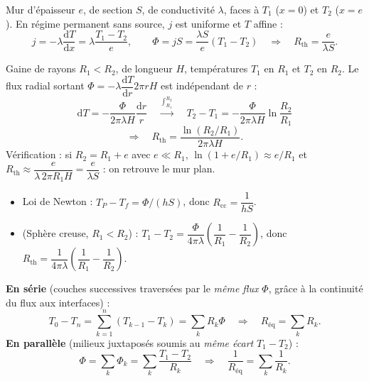 \documentclass[11pt,a4paper]{article}
\newcommand{\dd}{\mathrm{d}}
\begin{document}
\begin{demo}[title={Démonstration : résistance d'un mur plan (cartésien 1D)}]
Mur d'épaisseur $e$, de section $S$, de conductivité $\lambda$, faces à $T_1$ ($x=0$) et $T_2$
($x=e$). En régime permanent sans source, $j$ est uniforme et $T$ affine :
\[ j=-\lambda\dfrac{\dd T}{\dd x}=\lambda\dfrac{T_1-T_2}{e},
   \qquad \Phi=jS=\dfrac{\lambda S}{e}(T_1-T_2)
   \quad\Longrightarrow\quad \boxed{R_{\mathrm{th}}=\dfrac{e}{\lambda S}}. \]
\end{demo}

\begin{demo}[title={Démonstration : résistance d'une gaine cylindrique}]
Gaine de rayons $R_1<R_2$, de longueur $H$, températures $T_1$ en $R_1$ et $T_2$ en $R_2$.
Le flux radial sortant $\Phi=-\lambda\dfrac{\dd T}{\dd r}2\pi rH$ est indépendant de $r$ :
\[ \dd T=-\dfrac{\Phi}{2\pi\lambda H}\dfrac{\dd r}{r}
   \quad\xrightarrow{\ \int_{R_1}^{R_2}\ }\quad
   T_2-T_1=-\dfrac{\Phi}{2\pi\lambda H}\ln\dfrac{R_2}{R_1} \]
\[ \Longrightarrow\quad \boxed{R_{\mathrm{th}}=\dfrac{\ln(R_2/R_1)}{2\pi\lambda H}}. \]
Vérification : si $R_2=R_1+e$ avec $e\ll R_1$, $\ln(1+e/R_1)\approx e/R_1$ et
$R_{\mathrm{th}}\approx\dfrac{e}{\lambda\,2\pi R_1H}=\dfrac{e}{\lambda S}$ : on retrouve le mur
plan.
\end{demo}

\begin{demo}[title={Résistance conducto-convective et coquille sphérique}]
\begin{itemize}[leftmargin=1.5em]
  \item Loi de Newton : $T_P-T_f=\Phi/(hS)$, donc $\boxed{R_{\mathrm{cc}}=\dfrac{1}{hS}}$.
  \item (Sphère creuse, $R_1<R_2$) : $T_1-T_2=\dfrac{\Phi}{4\pi\lambda}\left(\dfrac1{R_1}-\dfrac1{R_2}\right)$,
        donc $R_{\mathrm{th}}=\dfrac{1}{4\pi\lambda}\left(\dfrac1{R_1}-\dfrac1{R_2}\right)$.
\end{itemize}
\end{demo}

\begin{demo}[title={Démonstration : associations de résistances thermiques}]
\textbf{En série} (couches successives traversées par le \emph{même flux} $\Phi$, grâce à la
continuité du flux aux interfaces) :
\[ T_0-T_n=\sum_{k=1}^{n}(T_{k-1}-T_k)=\sum_k R_k\Phi
   \quad\Longrightarrow\quad \boxed{R_{\text{éq}}=\sum_k R_k}. \]
\textbf{En parallèle} (milieux juxtaposés soumis au \emph{même écart} $T_1-T_2$) :
\[ \Phi=\sum_k\Phi_k=\sum_k\dfrac{T_1-T_2}{R_k}
   \quad\Longrightarrow\quad \boxed{\dfrac1{R_{\text{éq}}}=\sum_k\dfrac1{R_k}}. \]
\end{demo}
\end{document}
